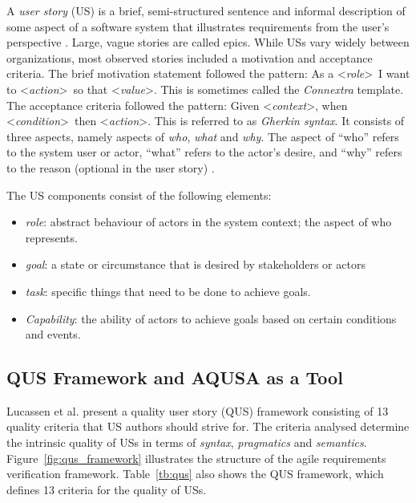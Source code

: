 A \emph{user story} (US) is a brief, semi-structured sentence and informal description of some aspect of a software system that illustrates requirements from the user’s perspective \cite{raharjana2021user}. Large, vague stories are called epics. While USs vary widely between organizations, most observed stories included a motivation and acceptance criteria. The brief motivation statement followed the pattern:  As a  \textless\emph{role}\textgreater\ I want to \textless\emph{action}\textgreater\ so that \textless\emph{value}\textgreater. This is sometimes called the \emph{Connextra} template. The acceptance criteria followed the pattern: Given \textless\emph{context}\textgreater, when \textless\emph{condition}\textgreater \  then \textless\emph{action}\textgreater. This is referred to as \emph{Gherkin syntax}\cite{wynne2017cucumber}. It consists of three aspects, namely aspects of \emph{who}, \emph{what} and \emph{why}. The aspect of \enquote{who} refers to the system user or actor, \enquote{what} refers to the actor’s desire, and \enquote{why} refers to the reason (optional in the user story) \cite{raharjana2021user}.

The US components consist of the following elements\cite{wautelet2017user}: 
\begin{itemize}
\item\emph{role}: abstract behaviour of actors in the system context; the aspect of who represents.
\item\emph{goal}: a state or circumstance that is desired by stakeholders or actors
\item\emph{task}: specific things that need to be done to achieve goals.
\item\emph{Capability}: the ability of actors to achieve goals based on certain conditions and events.
\end{itemize}


\subsection{QUS Framework and AQUSA as a Tool}\label{quality-framework}
Lucassen et al. \cite{lucassen2016improving} present a quality user story (QUS) framework consisting of 13 quality criteria that US authors should strive for. The criteria analysed determine the intrinsic quality of USs in terms of \emph{syntax}, \emph{pragmatics} and \emph{semantics}. Figure~\ref{fig:qus_framework} illustrates the structure of the agile requirements verification framework. Table~\ref{tb:qus} also shows the QUS framework, which defines 13 criteria for the quality of USs.

